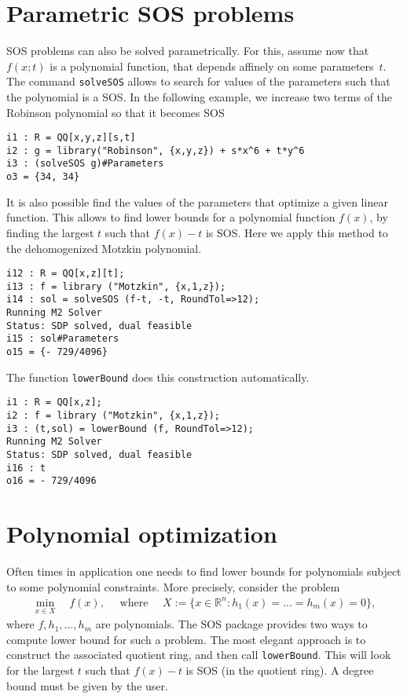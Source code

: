 \documentclass[11pt]{amsart}
\theoremstyle{plain}%
\theoremstyle{definition}
\theoremstyle{remark}
\newcommand{\SOS}{\textsc{SOS}\xspace}
\newcommand{\RR}{\mathbb{R}}
\begin{document}

\section{Parametric SOS problems}

SOS problems can also be solved parametrically.
For this, assume now that $f(x;t)$ is a polynomial function, that depends affinely on some parameters~$t$.
The command \verb|solveSOS| allows to search for values of the parameters such that the polynomial is a SOS.
In the following example, we increase two terms of the Robinson polynomial so that it becomes SOS

{\small
\begin{verbatim}
i1 : R = QQ[x,y,z][s,t]
i2 : g = library("Robinson", {x,y,z}) + s*x^6 + t*y^6
i3 : (solveSOS g)#Parameters
o3 = {34, 34}
\end{verbatim}
}

It is also possible find the values of the parameters that optimize a given linear function.
This allows to find lower bounds for a polynomial function $f(x)$,
by finding the largest $t$ such that $f(x)-t$ is SOS.
Here we apply this method to the dehomogenized Motzkin polynomial.
{\small
\begin{verbatim}
i12 : R = QQ[x,z][t];
i13 : f = library ("Motzkin", {x,1,z});
i14 : sol = solveSOS (f-t, -t, RoundTol=>12);
Running M2 Solver
Status: SDP solved, dual feasible
i15 : sol#Parameters
o15 = {- 729/4096}
\end{verbatim}
}
The function \verb|lowerBound| does this construction automatically.
{\small
\begin{verbatim}
i1 : R = QQ[x,z];
i2 : f = library ("Motzkin", {x,1,z});
i3 : (t,sol) = lowerBound (f, RoundTol=>12);
Running M2 Solver
Status: SDP solved, dual feasible
i16 : t
o16 = - 729/4096
\end{verbatim}
}

\section{Polynomial optimization}

Often times in application one needs to find lower bounds for polynomials subject to some polynomial constraints.
More precisely, consider the problem
\begin{align*}
  \min_{x\in X} \quad f(x),
  \quad \text{ where }\quad
  X := \{x \in \RR^n : h_1(x)=\dots=h_m(x)=0\},
\end{align*}
where $f, h_1,\dots,h_m$ are polynomials.
The \SOS package provides two ways to compute lower bound for such a problem.
The most elegant approach is to construct the associated quotient ring, and then call \verb|lowerBound|.
This will look for the largest $t$ such that $f(x)-t$ is SOS (in the quotient ring).
A degree bound must be given by the user.
\end{document}
